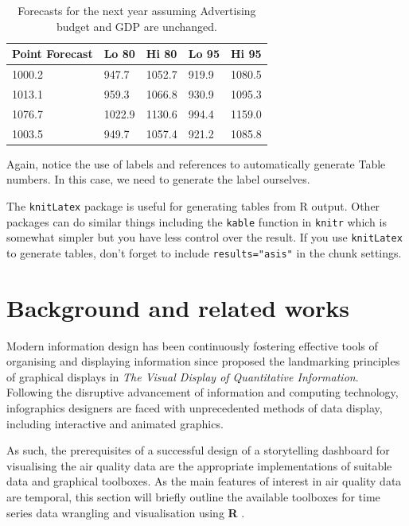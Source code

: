 \documentclass{aucklandthesis}
\begin{document}
\begin{table}[ht]
\begin{center}
\begin{tabular}{lllll}
\toprule
Point Forecast & Lo 80 & Hi 80 & Lo 95 & Hi 95 \\
\midrule
1000.2 &  947.7 & 1052.7 & 919.9 & 1080.5 \\
1013.1 &  959.3 & 1066.8 & 930.9 & 1095.3 \\
1076.7 & 1022.9 & 1130.6 & 994.4 & 1159.0 \\
1003.5 &  949.7 & 1057.4 & 921.2 & 1085.8 \\
\bottomrule
\end{tabular}
\caption{Forecasts for the next year assuming Advertising budget and GDP are unchanged.}
\label{tab:salesforecasts}
\end{center}
\end{table}

Again, notice the use of labels and references to automatically generate Table numbers. In this case, we need to generate the label ourselves.

The \texttt{knitLatex} package is useful for generating tables from R output. Other packages can do similar things including the \texttt{kable} function in \texttt{knitr} which is somewhat simpler but you have less control over the result. If you use \texttt{knitLatex} to generate tables, don't forget to include \texttt{results="asis"} in the chunk settings.

\hypertarget{ch:litreview}{%
\chapter{Background and related works}\label{ch:litreview}}

Modern information design has been continuously fostering effective tools of organising and displaying information since \textcite{tufte} proposed the landmarking principles of graphical displays in \emph{The Visual Display of Quantitative Information}. Following the disruptive advancement of information and computing technology, infographics designers are faced with unprecedented methods of data display, including interactive and animated graphics.

As such, the prerequisites of a successful design of a storytelling dashboard for visualising the air quality data are the appropriate implementations of suitable data and graphical toolboxes. As the main features of interest in air quality data are temporal, this section will briefly outline the available toolboxes for time series data wrangling and visualisation using \textbf{R} \autocite{R2021}.
\end{document}

